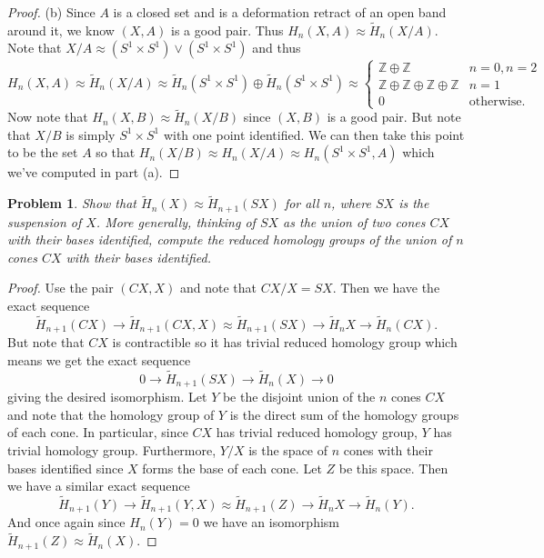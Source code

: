 \documentclass{article}
\newtheorem{problem}{Problem}
\begin{document}
\begin{proof}
(b) Since $A$ is a closed set and is a deformation retract of an open band around it, we know $(X,A)$ is a good pair. Thus $H_n(X,A) \approx \widetilde{H}_n(X/A)$. Note that $X/A \approx (S^1 \times S^1) \vee (S^1 \times S^1)$ and thus
\[
H_n(X,A) \approx \widetilde{H}_n(X/A) \approx \widetilde{H}_n(S^1 \times S^1) \oplus \widetilde{H}_n(S^1 \times S^1) \approx
\begin{cases}
\mathbb{Z} \oplus \mathbb{Z} & n = 0, n = 2\\
\mathbb{Z} \oplus \mathbb{Z} \oplus \mathbb{Z} \oplus \mathbb{Z} & n = 1\\
0 & \text{otherwise}.
\end{cases}
\]
Now note that $H_n(X,B) \approx \widetilde{H}_n(X/B)$ since $(X,B)$ is a good pair. But note that $X/B$ is simply $S^1 \times S^1$ with one point identified. We can then take this point to be the set $A$ so that $H_n(X/B) \approx H_n(X/A) \approx H_n(S^1 \times S^1, A)$ which we've computed in part (a).
\end{proof}

\begin{problem}
\label{sus}
Show that $\widetilde{H}_n(X) \approx \widetilde{H}_{n+1}(SX)$ for all $n$, where $SX$ is the suspension of $X$. More generally, thinking of $SX$ as the union of two cones $CX$ with their bases identified, compute the reduced homology groups of the union of $n$ cones $CX$ with their bases identified.
\end{problem}
\begin{proof}
Use the pair $(CX,X)$ and note that $CX/X = SX$. Then we have the exact sequence
\[
\widetilde{H}_{n+1}(CX) \to \widetilde{H}_{n+1}(CX,X) \approx \widetilde{H}_{n+1}(SX) \to \widetilde{H}_n{X} \to \widetilde{H}_n(CX).
\]
But note that $CX$ is contractible so it has trivial reduced homology group which means we get the exact sequence
\[
0 \to \widetilde{H}_{n+1}(SX) \to \widetilde{H}_n(X) \to 0
\]
giving the desired isomorphism. Let $Y$ be the disjoint union of the $n$ cones $CX$ and note that the homology group of $Y$ is the direct sum of the homology groups of each cone. In particular, since $CX$ has trivial reduced homology group, $Y$ has trivial homology group. Furthermore, $Y/X$ is the space of $n$ cones with their bases identified since $X$ forms the base of each cone. Let $Z$ be this space. Then we have a similar exact sequence
\[
\widetilde{H}_{n+1}(Y) \to \widetilde{H}_{n+1}(Y,X) \approx \widetilde{H}_{n+1}(Z) \to \widetilde{H}_n{X} \to \widetilde{H}_n(Y).
\]
And once again since $H_n(Y) = 0$ we have an isomorphism $\widetilde{H}_{n+1}(Z) \approx \widetilde{H}_n(X)$.
\end{proof}
\end{document}
